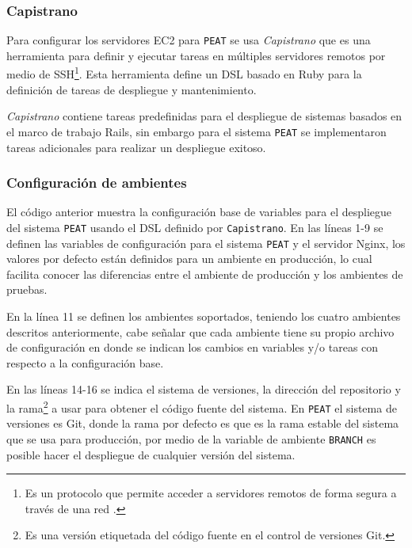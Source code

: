 \subsubsection{Capistrano}

Para configurar los servidores EC2 para \texttt{PEAT} se usa \textit{Capistrano}
que es una herramienta para definir y ejecutar tareas en
múltiples servidores remotos por medio de SSH\footnote{Es un protocolo que permite
  acceder a servidores remotos de forma segura a través de una red
  \cite{29_ssh_protocol}.}. Esta herramienta define un DSL basado en Ruby para la
definición de tareas de despliegue y mantenimiento.

\textit{Capistrano} contiene tareas predefinidas para el despliegue de sistemas
basados en el marco de trabajo Rails, sin embargo para el sistema \texttt{PEAT} se
implementaron tareas adicionales para realizar un despliegue exitoso.

\subsubsection{Configuración de ambientes}



El código anterior muestra la configuración base de variables para el
despliegue del sistema \texttt{PEAT} usando el DSL definido por \texttt{Capistrano}.
En las líneas 1-9 se definen las variables de configuración para el sistema
\texttt{PEAT} y el servidor Nginx, los valores por defecto están definidos
para un ambiente en producción, lo cual facilita conocer las diferencias
entre el ambiente de producción y los ambientes de pruebas.

En la línea 11 se definen los ambientes soportados, teniendo los cuatro
ambientes descritos anteriormente, cabe señalar que cada ambiente tiene
su propio archivo de configuración en donde se indican los cambios en variables
y/o tareas con respecto a la configuración base.

En las líneas 14-16 se indica el sistema de versiones, la dirección del repositorio
y la rama\footnote{Es una versión etiquetada del código fuente en el control de
  versiones Git.} a usar para obtener el código fuente del sistema.
En \texttt{PEAT} el sistema de versiones es Git, donde la rama por defecto
es  que es la rama estable del sistema que
se usa para producción, por medio de la variable de ambiente \texttt{BRANCH} es
posible hacer el despliegue de cualquier versión del sistema.

